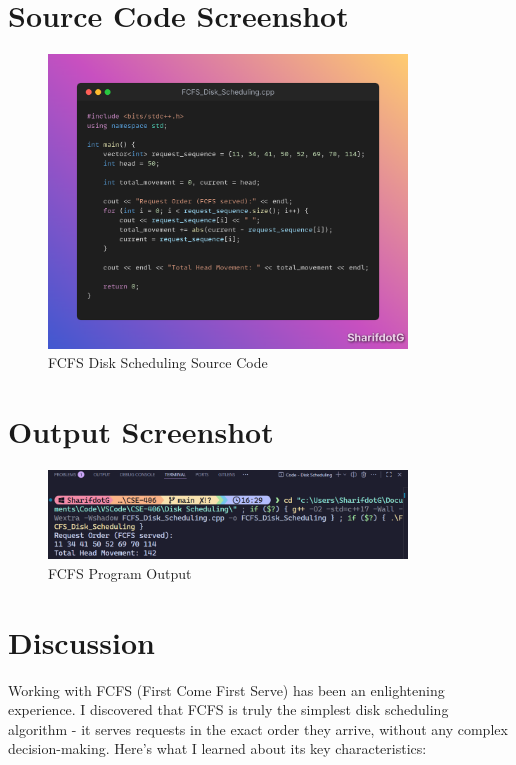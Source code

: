 \documentclass[12pt,a4paper]{article}
\begin{document}
\section{Source Code Screenshot}
\begin{figure}[H]
  \centering
  \includegraphics[width=0.85\textwidth]{Code.png}
  \caption{FCFS Disk Scheduling Source Code}
\end{figure}

\section{Output Screenshot}
\begin{figure}[H]
  \centering
  \includegraphics[width=0.85\textwidth]{Screenshot 2025-08-21 163132.png}
  \caption{FCFS Program Output}
\end{figure}

\section{Discussion}
Working with FCFS (First Come First Serve) has been an enlightening experience. I discovered that FCFS is truly the simplest disk scheduling algorithm - it serves requests in the exact order they arrive, without any complex decision-making. Here's what I learned about its key characteristics:
\end{document}

